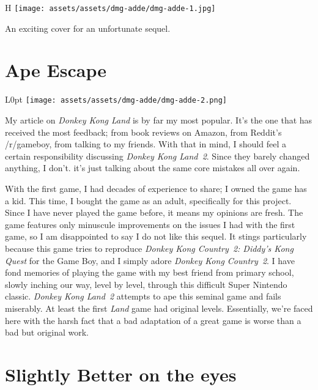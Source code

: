 \documentclass{book}
\begin{document}
\begin{wrapfigure}{H}{\linewidth}
\vskip 4pt
\centering \texttt{[image: assets/assets/dmg-adde/dmg-adde-1.jpg]}\par\pagetwodescription An exciting cover for an unfortunate sequel.\end{wrapfigure}
\clearpage

\FloatBarrier\needspace{5pt}\section*{Ape Escape}\nopagebreak[4]

\begin{wrapfigure}{L}{0pt} \texttt{[image: assets/assets/dmg-adde/dmg-adde-2.png]}\end{wrapfigure}

My article on \emph{Donkey Kong Land} is by far my most popular. It’s the one that has received the most feedback; from book reviews on Amazon, from Reddit’s /r/gameboy, from talking to my friends. With that in mind, I should feel a certain responsibility discussing \emph{Donkey Kong Land 2}. Since they barely changed anything, I don’t. it’s just talking about the same core mistakes all over again.

With the first game, I had decades of experience to share; I owned the game has a kid. This time, I bought the game as an adult, specifically for this project. Since I have never played the game before, it means my opinions are fresh. The game features only minuscule improvements on the issues I had with the first game, so I am disappointed to say I do not like this sequel. It stings particularly because this game tries to reproduce \emph{Donkey Kong Country 2: Diddy’s Kong Quest} for the Game Boy, and I simply adore \emph{Donkey Kong Country 2}. I have fond memories of playing the game with my best friend from primary school, slowly inching our way, level by level, through this difficult Super Nintendo classic. \emph{Donkey Kong Land 2} attempts to ape this seminal game and fails miserably. At least the first \emph{Land} game had original levels. Essentially, we’re faced here with the harsh fact that a bad adaptation of a great game is worse than a bad but original work.

\FloatBarrier\needspace{5pt}\section*{Slightly Better on the eyes}\nopagebreak[4]
\end{document}
